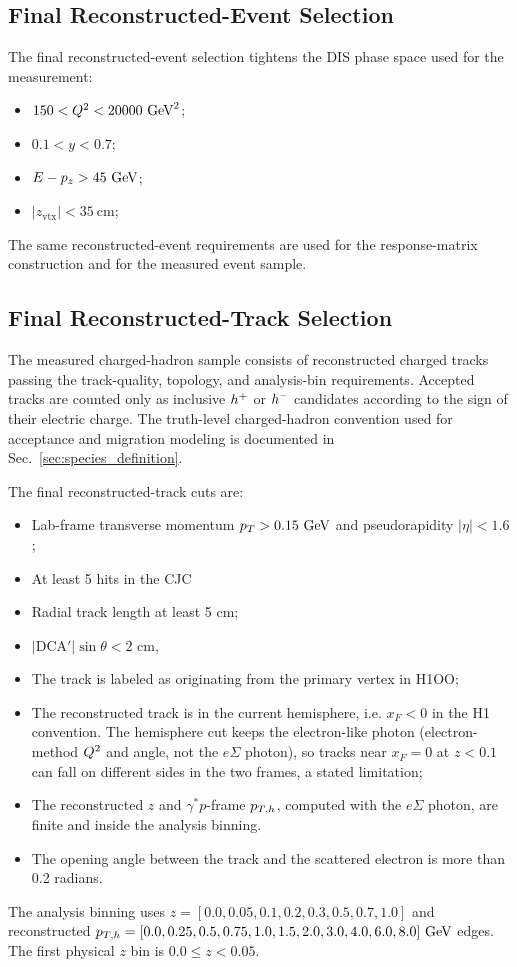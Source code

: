 \subsection{Final Reconstructed-Event Selection}
\label{sec:selection:final-events}

The final reconstructed-event selection tightens the DIS phase space used for
the measurement:
\begin{itemize}
  \item $150 < Q^2 < 20000~\text{GeV}^{2}$;
  \item $0.1 < y < 0.7$;
  \item $E-p_z > 45~\text{GeV}$;
  \item $|z_{\mathrm{vtx}}| < 35~\mathrm{cm}$;
\end{itemize}
The same reconstructed-event requirements are used for the response-matrix
construction and for the measured event sample.

\subsection{Final Reconstructed-Track Selection}
\label{sec:selection:final-tracks}

The measured charged-hadron sample consists of reconstructed charged tracks
passing the track-quality, topology, and analysis-bin requirements.  Accepted tracks are counted only as inclusive $h^{+}$ or $h^{-}$ candidates according to the sign of their electric charge.
The truth-level charged-hadron convention used for acceptance and migration
modeling is documented in Sec.~\ref{sec:species_definition}.

The final reconstructed-track cuts are:
\begin{itemize}
  \item Lab-frame transverse momentum $p_T>0.15~\text{GeV}$ and pseudorapidity $|\eta|<1.6$;
  \item At least 5 hits in the CJC
  \item Radial track length at least 5 cm;
  \item $|\mathrm{DCA}'|\sin\theta < 2$ cm,
  \item The track is labeled as originating from the primary vertex in H1OO;
  \item The reconstructed track is in the current hemisphere, i.e. $x_F<0$ in the H1 convention.  The hemisphere cut keeps the electron-like photon (electron-method $Q^{2}$ and angle, not the $e\Sigma$ photon), so tracks near $x_F=0$ at $z<0.1$ can fall on different sides in the two frames, a stated limitation;
  \item The reconstructed $z$ and $\gamma^*p$-frame $p_{T,h}$, computed with the $e\Sigma$ photon, are finite and inside
        the analysis binning.
   \item The opening angle between the track and the scattered electron is more than 0.2 radians.
\end{itemize}
The analysis binning uses
$z=[0.0,0.05,0.1,0.2,0.3,0.5,0.7,1.0]$ and reconstructed
$p_{T,h}=[0.0,0.25,0.5,0.75,1.0,1.5,2.0,3.0,4.0,6.0,8.0]~\text{GeV}$ edges.  The first
physical $z$ bin is $0.0 \le z < 0.05$.

